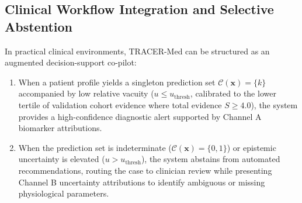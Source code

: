 \documentclass[3p,12pt]{elsarticle}
\theoremstyle{plain}
\theoremstyle{definition}
\begin{document}
\subsection{Clinical Workflow Integration and Selective Abstention}
In practical clinical environments, TRACER-Med can be structured as an augmented decision-support co-pilot:
\begin{enumerate}
    \item When a patient profile yields a singleton prediction set $\mathcal{C}(\mathbf{x}) = \{k\}$ accompanied by low relative vacuity ($u \le u_{\text{thresh}}$, calibrated to the lower tertile of validation cohort evidence where total evidence $S \ge 4.0$), the system provides a high-confidence diagnostic alert supported by Channel A biomarker attributions.
    \item When the prediction set is indeterminate ($\mathcal{C}(\mathbf{x}) = \{0, 1\}$) or epistemic uncertainty is elevated ($u > u_{\text{thresh}}$), the system abstains from automated recommendations, routing the case to clinician review while presenting Channel B uncertainty attributions to identify ambiguous or missing physiological parameters.
\end{enumerate}
\end{document}
